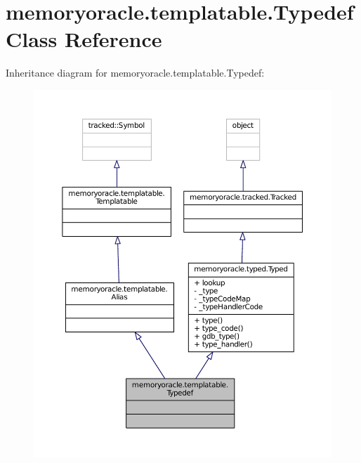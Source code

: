 \hypertarget{classmemoryoracle_1_1templatable_1_1Typedef}{}\section{memoryoracle.\+templatable.\+Typedef Class Reference}
\label{classmemoryoracle_1_1templatable_1_1Typedef}


Inheritance diagram for memoryoracle.\+templatable.\+Typedef\+:\nopagebreak
\begin{figure}[H]
\begin{center}
\leavevmode
\includegraphics[width=350pt]{classmemoryoracle_1_1templatable_1_1Typedef__inherit__graph}
\end{center}
\end{figure}


